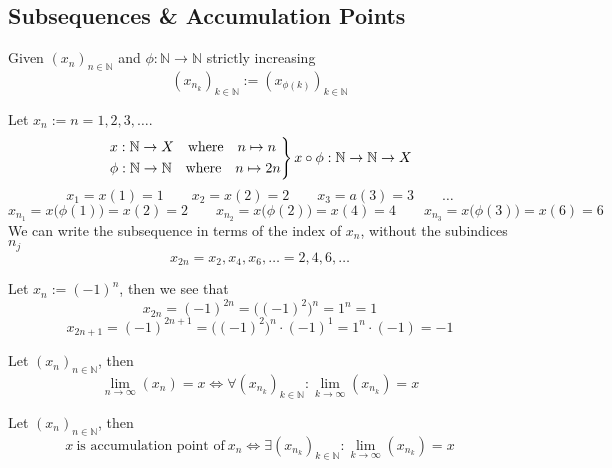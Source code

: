 \subsection{Subsequences \& Accumulation Points}
\begin{definition}[Subsequence]
   Given \((x_n)_{n \in \mathbb{N}}\) and \(\phi: \mathbb{N} \to \mathbb{N}\) strictly increasing
   \[(x_{n_k})_{k \in \mathbb{N}} := (x_{\phi(k)})_{k \in \mathbb{N}}\]
\end{definition}
\begin{example}
   Let \(x_n := n = 1, 2, 3, \ldots\).
   \[\begin{drcases}
         x: \mathbb{N} \to X \quad\text{where}\quad n \mapsto n \\
         \phi: \mathbb{N} \to \mathbb{N} \quad\text{where}\quad n \mapsto 2n
   \end{drcases} x \circ \phi: \mathbb{N} \to \mathbb{N} \to X\]
   \[x_1 = x(1) = 1 \qquad x_2 = x(2) = 2 \qquad x_3 = a(3) = 3 \qquad \ldots\]
   \[x_{n_1} = x\big(\phi(1)\big) = x(2) = 2 \qquad x_{n_2} = x\big(\phi(2)\big) = x(4) = 4 \qquad x_{n_3} = x\big(\phi(3)\big) = x(6) = 6\]
   We can write the subsequence in terms of the index of \(x_n\), without the subindices \(n_j\)
   \[x_{2n} = x_2, x_4, x_6, \ldots = 2, 4, 6, \ldots\]
\end{example}
\begin{example}
   Let \(x_n := (-1)^n\), then we see that
   \[x_{2n} = (-1)^{2n} = \big((-1)^2\big)^n = 1^n = 1\]
   \[x_{2n+1} = (-1)^{2n+1} = \big((-1)^2\big)^n \cdot (-1)^1 = 1^n \cdot (-1) = -1\]
\end{example}

\begin{theorem}\label{thm:all_subseq_conv}
   Let \((x_n)_{n \in \mathbb{N}}\), then
   \[\lim_{n \to \infty}(x_n) = x \iff \forall (x_{n_k})_{k \in \mathbb{N}}: \lim_{k \to \infty}(x_{n_k}) = x\]
\end{theorem}

\begin{theorem}\label{thm:cp_iff_subseq}
   Let \((x_n)_{n \in \mathbb{N}}\), then
   \[x~\text{is accumulation point of}~x_n \iff \exists (x_{n_k})_{k \in \mathbb{N}}: \lim_{k \to \infty}(x_{n_k}) = x\]
\end{theorem}


